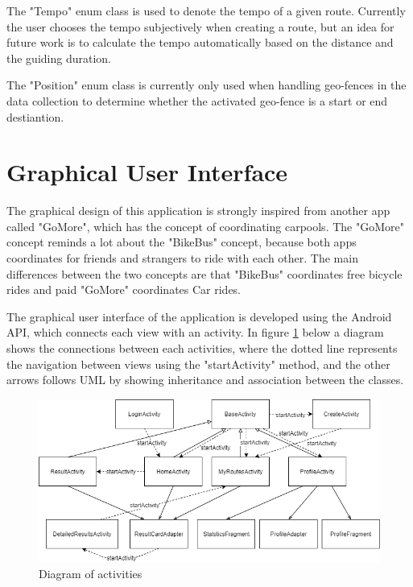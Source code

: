 The "Tempo" enum class is used to denote the tempo of a given route. Currently the user chooses the tempo subjectively when creating a route, but an idea for future work is to calculate the tempo automatically based on the distance and the guiding duration.

The "Position" enum class is currently only used when handling geo-fences in the data collection to determine whether the activated geo-fence is a start or end destiantion.

\section{Graphical User Interface}
The graphical design of this application is strongly inspired from another app called "GoMore", which has the concept of coordinating carpools. The "GoMore" concept reminds a lot about the "BikeBus" concept, because both apps coordinates for friends and strangers to ride with each other. The main differences between the two concepts are that "BikeBus" coordinates free bicycle rides and paid "GoMore" coordinates Car rides.

The graphical user interface of the application is developed using the Android API, which connects each view with an activity. In figure \ref{fig:activities} below a diagram shows the connections between each activities, where the dotted line represents the navigation between views using the "startActivity" method, and the other arrows follows UML by showing inheritance and association between the classes.   

\begin{figure}[H]
    \centering
    \includegraphics[scale=0.5]{Graphics/Images/Activity_Diagram.png}
    \caption{Diagram of activities}
    \label{fig:activities}
\end{figure}

